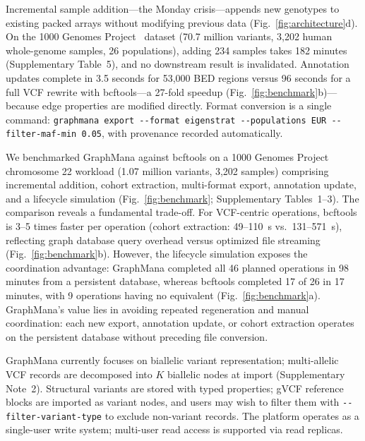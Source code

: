 \documentclass[pdflatex,sn-nature]{sn-jnl}
\newcommand{\code}[1]{\texttt{\small #1}}
\begin{document}
Incremental sample addition---the Monday crisis---appends new genotypes to existing packed arrays without modifying previous data (Fig.~\ref{fig:architecture}d). On the 1000 Genomes Project~\cite{byrska2022} dataset (70.7 million variants, 3,202 human whole-genome samples, 26 populations), adding 234 samples takes 182 minutes (Supplementary Table~5), and no downstream result is invalidated. Annotation updates complete in 3.5 seconds for 53,000 BED regions versus 96 seconds for a full VCF rewrite with bcftools---a 27-fold speedup (Fig.~\ref{fig:benchmark}b)---because edge properties are modified directly. Format conversion is a single command: \code{graphmana export -{}-format eigenstrat -{}-populations EUR -{}-filter-maf-min 0.05}, with provenance recorded automatically.

We benchmarked GraphMana against bcftools on a 1000 Genomes Project chromosome 22 workload (1.07 million variants, 3,202 samples) comprising incremental addition, cohort extraction, multi-format export, annotation update, and a lifecycle simulation (Fig.~\ref{fig:benchmark}; Supplementary Tables~1--3). The comparison reveals a fundamental trade-off. For VCF-centric operations, bcftools is 3--5 times faster per operation (cohort extraction: 49--110~s vs.\ 131--571~s), reflecting graph database query overhead versus optimized file streaming (Fig.~\ref{fig:benchmark}b). However, the lifecycle simulation exposes the coordination advantage: GraphMana completed all 46 planned operations in 98 minutes from a persistent database, whereas bcftools completed 17 of 26 in 17 minutes, with 9 operations having no equivalent (Fig.~\ref{fig:benchmark}a). GraphMana's value lies in avoiding repeated regeneration and manual coordination: each new export, annotation update, or cohort extraction operates on the persistent database without preceding file conversion.

GraphMana currently focuses on biallelic variant representation; multi-allelic VCF records are decomposed into $K$ biallelic nodes at import (Supplementary Note~2). Structural variants are stored with typed properties; gVCF reference blocks are imported as variant nodes, and users may wish to filter them with \code{-{}-filter-variant-type} to exclude non-variant records. The platform operates as a single-user write system; multi-user read access is supported via read replicas.
\end{document}
